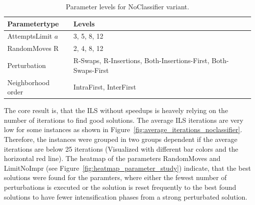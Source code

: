 \begin{table}[ht]
  \centering
  \setlength{\tabcolsep}{2em}
  \def\arraystretch{1.1}
  \begin{tabular}{@{}P{4cm}P{8cm}@{}}
    \toprule
    Parametertype      & Levels                                                         \\
    \midrule
    AttemptsLimit $a$  & 3, 5, 8, 12                                                    \\
    RandomMoves R      & 2, 4, 8, 12                                                    \\
    Perturbation       & R-Swaps, R-Insertions, Both-Insertions-First, Both-Swaps-First \\
    Neighborhood order & IntraFirst, InterFirst                                         \\
    \bottomrule
  \end{tabular}
  \caption{Parameter levels for NoClassifier variant.}
  \label{tab:parameters_noclassifier}
\end{table}

The core result is, that the \gls{ILS} without speedups is heavely relying on the number of iterations to find good
solutions. The average \gls{ILS} iterations are very low for some instances as shown in Figure~\ref{fig:average_iterations_noclassifier}.
Therefore, the instances were grouped in two groups dependent if the average iterations are below 25 iterations (Visualized with different bar
colors and the horizontal red line). The heatmap of the parameters RandomMoves and LimitNoImpr (see Figure~\ref{fig:heatmap_parameter_study}) indicate, that the best solutions
were found for the paramters, where either the fewest number of perturbations is executed or the solution is reset frequently to the best found
solutions to have fewer intensification phases from a strong perturbated solution.

